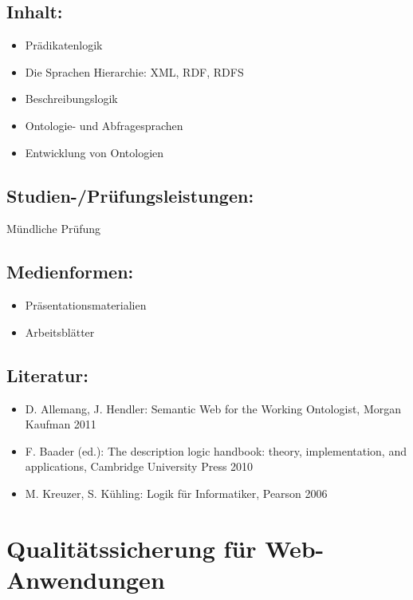 \section*{Inhalt:}\label{inhalt-26}

\begin{itemize}
\item
  Prädikatenlogik
\item
  Die Sprachen Hierarchie: XML, RDF, RDFS
\item
  Beschreibungslogik
\item
  Ontologie- und Abfragesprachen
\item
  Entwicklung von Ontologien
\end{itemize}

\section*{Studien-/Prüfungsleistungen:}\label{studien-pruxfcfungsleistungen-26}

Mündliche Prüfung

\section*{Medienformen:}\label{medienformen-26}

\begin{itemize}
\item
  Präsentationsmaterialien
\item
  Arbeitsblätter
\end{itemize}

\section*{Literatur:}\label{literatur-23}

\begin{itemize}
\item
  D. Allemang, J. Hendler: Semantic Web for the Working Ontologist,
  Morgan Kaufman 2011
\item
  F. Baader (ed.): The description logic handbook: theory,
  implementation, and applications, Cambridge University Press 2010
\item
  M. Kreuzer, S. Kühling: Logik für Informatiker, Pearson 2006
\end{itemize}

\chapter{Qualitätssicherung für
Web-Anwendungen}\label{qualituxe4tssicherung-fuxfcr-web-anwendungen}

